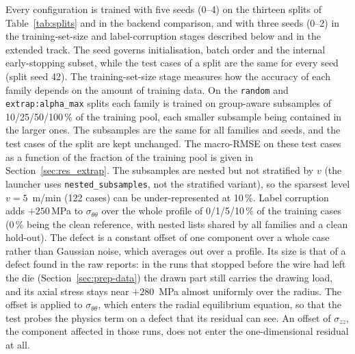 Every configuration is trained with five seeds (0--4) on the thirteen splits of
Table~\ref{tab:splits} and in the backend comparison, and with three seeds (0--2)
in the training-set-size and label-corruption stages described below and in the
extended track.
The seed governs initialisation, batch order and the internal early-stopping subset, %
while the test cases of a split are the same for every seed (split seed 42).
The training-set-size stage measures how the accuracy of each family depends on
the amount of training data. On the \texttt{random} and
\texttt{extrap:alpha\_max} splits each family is trained on group-aware
subsamples of 10/25/50/100\,\% of the training pool, each smaller subsample
being contained in the larger ones. The subsamples are the same for all
families and seeds, and the test cases of the split are kept unchanged. The
macro-RMSE on these test cases as a function of the fraction of the training
pool is given in Section~\ref{sec:res_extrap}.
The subsamples are nested but not stratified by $v$ (the launcher uses
\texttt{nested\_subsamples}, not the stratified variant), so the sparsest level
$v = 5$~m/min (122 cases) can be under-represented at 10\,\%.
Label corruption adds $+250$\,MPa to $\sigma_{\theta\theta}$ over the whole profile of 0/1/5/10\,\% of
the training cases (0\,\% being the clean reference, with nested lists shared by all
families and a clean hold-out). The defect is a constant offset of one component over a whole case rather than Gaussian noise, which averages out over a profile. Its size is that of a defect found in the raw reports: in the runs that stopped before the wire had left the die (Section~\ref{sec:prep-data}) the drawn part still carries the drawing load, and its axial stress stays near $+280$~MPa almost uniformly over the radius. The offset is applied to $\sigma_{\theta\theta}$, which enters the radial equilibrium equation, so that the test probes the physics term on a defect that its residual can see. An offset of $\sigma_{zz}$, the component affected in those runs, does not enter the one-dimensional residual at all.
